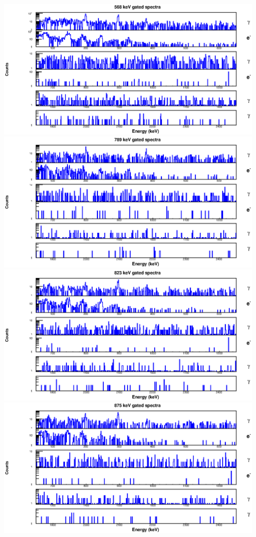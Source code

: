 \begin{landscape}
\includegraphics[scale=1.2]{156Gd_Appendix/568_combined.eps}
\includegraphics[scale=1.2]{156Gd_Appendix/789_combined.eps}
\includegraphics[scale=1.2]{156Gd_Appendix/823_combined.eps}
\includegraphics[scale=1.2]{156Gd_Appendix/875_combined.eps}

\end{landscape}
